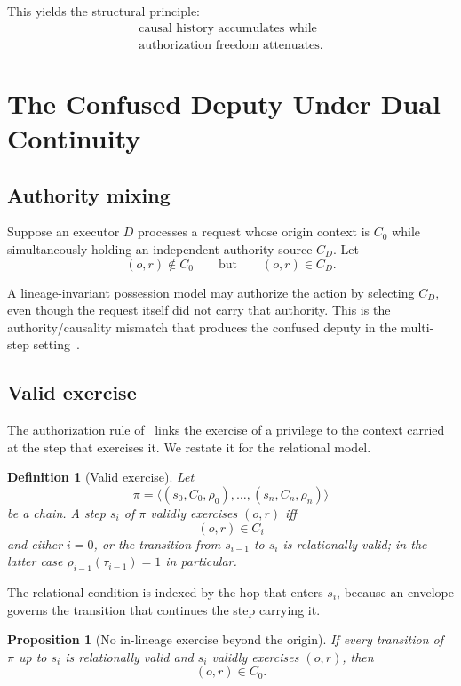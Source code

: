 \documentclass[10pt,twocolumn]{article}
\newtheorem{definition}{Definition}
\newtheorem{proposition}{Proposition}
\begin{document}
This yields the structural principle:
\[
\boxed{
\begin{gathered}
\text{causal history accumulates while}\\
\text{authorization freedom attenuates.}
\end{gathered}
}
\]

\section{The Confused Deputy Under Dual Continuity}

\subsection{Authority mixing}

Suppose an executor \(D\) processes a request whose origin context is \(C_0\)
while simultaneously holding an independent authority source \(C_D\). Let
\[
(o,r)\notin C_0
\qquad\text{but}\qquad
(o,r)\in C_D.
\]

A lineage-invariant possession model may authorize the action by selecting
\(C_D\), even though the request itself did not carry that authority. This is
the authority/causality mismatch that produces the confused deputy in the
multi-step setting~\cite{gallo2026poc}.

\subsection{Valid exercise}

The authorization rule of~\cite{gallo2026poc} links the exercise of a privilege
to the context carried at the step that exercises it. We restate it for the
relational model.

\begin{definition}[Valid exercise]\label{def:exercise}
Let
\[
\pi=
\langle
(s_0,C_0,\rho_0),
\ldots,
(s_n,C_n,\rho_n)
\rangle
\]
be a chain. A step \(s_i\) of \(\pi\) \emph{validly exercises} \((o,r)\) iff
\[
(o,r)\in C_i
\]
and either \(i=0\), or the transition from \(s_{i-1}\) to \(s_i\) is
relationally valid; in the latter case \(\rho_{i-1}(\tau_{i-1})=1\) in
particular.
\end{definition}

The relational condition is indexed by the hop that enters \(s_i\), because an
envelope governs the transition that continues the step carrying it.

\begin{proposition}[No in-lineage exercise beyond the origin]
\label{prop:inlineage}
If every transition of \(\pi\) up to \(s_i\) is relationally valid and \(s_i\)
validly exercises \((o,r)\), then
\[
(o,r)\in C_0.
\]
\end{proposition}
\end{document}

